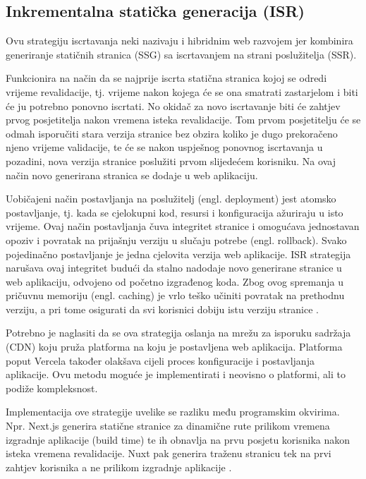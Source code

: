 \subsection{Inkrementalna statička generacija (ISR)}

Ovu strategiju iscrtavanja neki nazivaju i hibridnim web razvojem jer kombinira generiranje statičnih stranica (SSG) sa iscrtavanjem na strani poslužitelja (SSR).

\bigskip

Funkcionira na način da se najprije iscrta statična stranica kojoj se odredi vrijeme revalidacije, tj. vrijeme nakon kojega će se ona smatrati zastarjelom i biti će ju potrebno ponovno  iscrtati. No okidač za novo iscrtavanje biti će zahtjev prvog posjetitelja nakon vremena isteka revalidacije. Tom prvom posjetitelju će se odmah isporučiti stara verzija stranice bez obzira koliko je dugo prekoračeno njeno vrijeme validacije, te će se nakon uspješnog ponovnog iscrtavanja u pozadini, nova verzija stranice poslužiti prvom slijedećem korisniku. Na ovaj način novo generirana stranica se dodaje u web aplikaciju.

\bigskip

Uobičajeni način postavljanja na poslužitelj (engl. deployment) jest atomsko postavljanje, tj. kada se cjelokupni kod, resursi i konfiguracija ažuriraju u isto vrijeme. Ovaj način postavljanja čuva integritet stranice i omogućava jednostavan opoziv i povratak na prijašnju verziju u slučaju potrebe (engl. rollback). Svako pojedinačno postavljanje je jedna cjelovita verzija web aplikacije. ISR strategija narušava ovaj integritet budući da stalno nadodaje novo generirane stranice u web aplikaciju, odvojeno od početno izgrađenog koda. Zbog ovog spremanja u pričuvnu memoriju (engl. caching)  je vrlo teško učiniti povratak na prethodnu verziju, a pri tome osigurati da svi korisnici dobiju istu verziju stranice \cite{flaws2021isr}.

\bigskip

Potrebno je naglasiti da se ova strategija oslanja na mrežu za isporuku sadržaja (CDN) koju pruža platforma na koju je postavljena web aplikacija. Platforma poput Vercela također olakšava cijeli proces konfiguracije i postavljanja aplikacije. Ovu metodu moguće je implementirati i neovisno o platformi, ali to podiže kompleksnost.

\bigskip

Implementacija ove strategije uvelike se razliku među programskim okvirima.
Npr. Next.js generira statične stranice za dinamične rute prilikom vremena izgradnje aplikacije (build time) te ih obnavlja na prvu posjetu korisnika nakon isteka vremena revalidacije. Nuxt pak generira traženu stranicu tek na prvi zahtjev korisnika a ne prilikom izgradnje aplikacije \cite{troyan2024nuxt}.

